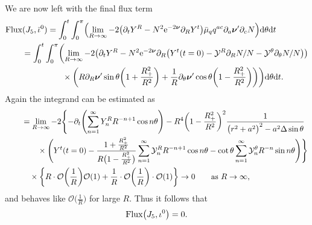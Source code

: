 \documentclass[11pt]{article}
\numberwithin{equation}{section}
\def\ptl{\partial}%
\def\mbo#1{\boldsymbol{#1}}%
\numberwithin{equation}{section}
\begin{document}
We are now left with the final flux term
\begin{align*}
&{\rm Flux} (J_5, \bar{\iota}^0) = \int^t_0 \int^\pi_0 \Bigl(\lim_{R \to \infty} -2\bigl(\ptl_t Y^R - N^2 {\rm e}^{-2 \mbo{\nu}} \ptl_R Y^t\bigr) \bar{\mu}_q q^{ac} \ptl_a \mbo{\nu}' \ptl_c N \Bigr) {\rm d}\theta {\rm d}t \notag\\
&\qquad{} = \int^t_0 \int^\pi_0 \biggl(\lim_{R \to \infty} -2 \bigl(\ptl_t Y^R - N^2 {\rm e}^{-2 \mbo{\nu}} \ptl_R \bigl(Y^t (t=0) - \mathcal Y^R \ptl_R N/N -\mathcal{Y}^\theta \ptl_\theta N/N\bigr) \bigr) \notag\\
& \qquad\hphantom{= \int^t_0 \int^\pi_0 \biggl(}{} \times\biggl(R \ptl_R \mbo{\nu}' \sin \theta \biggl(1+ \frac{R^2_+}{R^2}\biggr) + \frac{1}{R} \ptl_ \theta \mbo{\nu}' \cos \theta \biggl(1- \frac{R^2_+}{R^2}\biggr) \biggr) \biggr) {\rm d}\theta {\rm d}t.
\end{align*}
Again the integrand can be estimated as
\begin{align*}
\qquad&{}= \lim_{R \to \infty} -2 \Biggl\{- \ptl_t \Biggl(\sum^{\infty}_{n=1} Y^R_n R^{-n+1} \cos n \theta \Biggr) - R^4 \biggl(1- \frac{R^2_+}{R^2}\biggr)^2 \frac{1}{ \bigl(r^2 +a^2\bigr)^2 - a^2 \Delta \sin \theta} \notag\\
& \qquad{}
\times \Biggl(Y^t(t=0)- \frac{1+ \frac{R^2_+}{R^2}}{R \bigl(1- \frac{R_+^2}{R^2}\bigr)} \sum^{\infty}_{n=1} \mathcal{Y}^R_n R^{-n+1} \cos n \theta - \cot \theta \sum^\infty_{n=1} \mathcal{Y}^\theta_n R^{-n} \sin n\theta \Biggr) \Biggr\} \notag\\
& \quad{}\times \biggl\{ R \cdot \mathcal{O} \biggl(\frac{1}{R}\biggr) \mathcal{O}(1) + \frac{1}{R} \cdot \mathcal{O}\biggl(\frac{1}{R}\biggr) \cdot \mathcal{O}(1) \biggr\} \to 0 \qquad \text{as} \ R \to \infty,
\end{align*}
and behaves like $\mathcal{O}\bigl(\frac{1}{R}\bigr)$ for large $R$.
Thus it follows that
\begin{align*}
{\rm Flux}\bigl(J_5, \iota^0\bigr) = 0.
\end{align*}
\end{document}
